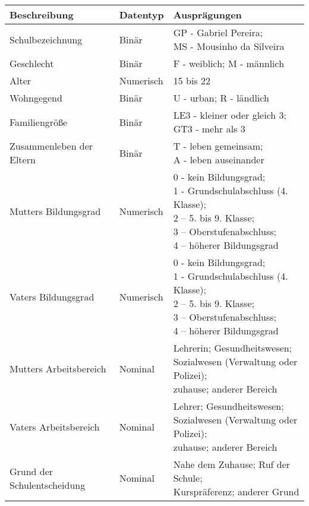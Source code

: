 \begin{table}[!ht]
    \centering
    \begin{tabular}{lll}
    \hline
        \textbf{Beschreibung} & \textbf{Datentyp} & \textbf{Ausprägungen} \\ \hline \hline
        Schulbezeichnung & Binär & \makecell[l]{GP - Gabriel Pereira; \\ MS - Mousinho da Silveira} \\ \hline
        Geschlecht & Binär & F - weiblich; M - männlich \\  \hline
        Alter & Numerisch & 15 bis 22 \\  \hline
        Wohngegend & Binär & U - urban; R - ländlich \\  \hline
        Familiengröße & Binär & \makecell[l]{LE3 - kleiner oder gleich 3; \\ GT3 - mehr als 3} \\  \hline
        Zusammenleben der Eltern & Binär & \makecell[l]{T - leben gemeinsam; \\ A - leben auseinander} \\  \hline
        Mutters Bildungsgrad & Numerisch & \makecell[l]{0 - kein Bildungsgrad; \\ 1 - Grundschulabschluss (4. Klasse); \\2 – 5. bis 9. Klasse; \\3 – Oberstufenabschluss; \\4 – höherer Bildungsgrad }\\  \hline
        Vaters Bildungsgrad & Numerisch & \makecell[l]{0 - kein Bildungsgrad; \\ 1 - Grundschulabschluss (4. Klasse); \\2 – 5. bis 9. Klasse; \\3 – Oberstufenabschluss; \\4 – höherer Bildungsgrad }\\  \hline
        Mutters Arbeitsbereich & Nominal & \makecell[l]{Lehrerin; Gesundheitswesen; \\Sozialwesen (Verwaltung oder Polizei); \\zuhause; anderer Bereich }\\  \hline
        Vaters Arbeitsbereich & Nominal & \makecell[l]{Lehrer; Gesundheitswesen; \\Sozialwesen (Verwaltung oder Polizei); \\zuhause; anderer Bereich }\\  \hline
        Grund der Schulentscheidung & Nominal & \makecell[l]{Nahe dem Zuhause; Ruf der Schule; \\Kurspräferenz; anderer Grund }\\  \hline

\end{tabular}
\end{table}
